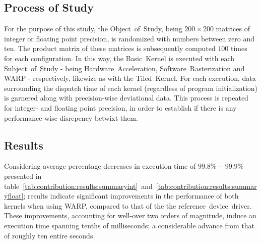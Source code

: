 \subsection{Process of Study}
\label{sec:contribution:processofstudy}
For the purpose of this study, the Object~of~Study, being $200\times 200$ matrices of integer or floating point precision, is randomized with numbers between zero and ten.
The product matrix of these matrices is subsequently computed $100$ times for each configuration.
In this way, the Basic~Kernel is executed with each Subject~of~Study - being Hardware~Acceleration, Software~Rasterization and WARP - respectively, likewize as with the Tiled~Kernel.
For each execution, data surrounding the dispatch time of each kernel (regardless of program initialization) is garnered along with precision-wise deviational data.
This process is repeated for integer- and floating point precision, in order to establish if there is any performance-wise disrepency betwixt them.

\subsection{Results}
\label{sec:contribution:results}
Considering average percentage decreases in execution time of $99.8\%-99.9\%$ presented in table~\ref{tab:contribution:results:summaryint}~and~\ref{tab:contribution:results:summaryfloat}; results indicate significant improvements in the performance of both kernels when using WARP, compared to that of the the reference~device~driver.
These improvements, accounting for well-over two orders of magnitude, induce an execution time spanning tenths of milliseconds; a considerable advance from that of roughly ten entire seconds.



